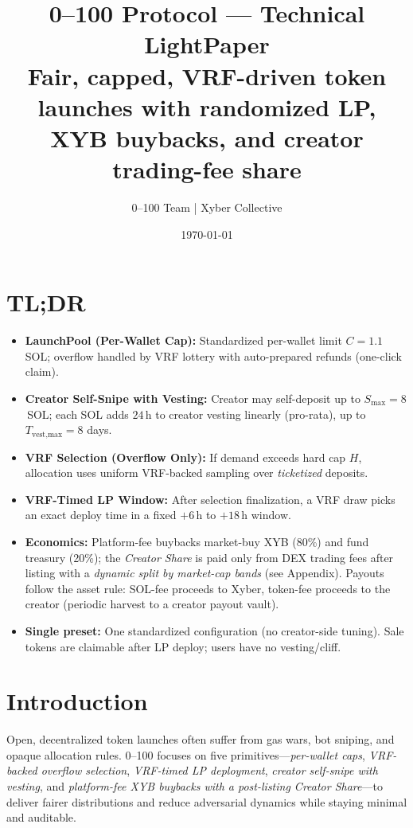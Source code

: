 \documentclass[10pt,twocolumn]{article}
\title{\Huge\bfseries 0--100 Protocol --- Technical LightPaper \\
\vspace{1ex} \large Fair, capped, VRF-driven token launches with randomized LP, \textdollar XYB buybacks, and creator trading-fee share}
\author{0--100 Team | Xyber Collective}
\date{\today}
\newcommand{\Ccap}{1.1}            %
\newcommand{\LPWinStart}{6}        %
\newcommand{\LPWinEnd}{18}         %
\newcommand{\CreatorSnipeMax}{8}   %
\newcommand{\VestingPerSolHours}{24} %
\begin{document}
\twocolumn[
  \begin{center}
    \maketitle
    \vspace{-1em}
  \end{center}
]


\section*{TL;DR}
\begin{itemize}
  \item \textbf{LaunchPool (Per-Wallet Cap):} Standardized per-wallet limit $C{=}\Ccap$\,SOL; overflow handled by VRF lottery with auto-prepared refunds (one-click claim).
  \item \textbf{Creator Self-Snipe with Vesting:} Creator may self-deposit up to $S_{\max}{=}\CreatorSnipeMax$\,SOL; each SOL adds $\VestingPerSolHours$\,h to creator vesting linearly (pro-rata), up to $T_{\text{vest,max}}{=}\CreatorSnipeMax$ days.
  \item \textbf{VRF Selection (Overflow Only):} If demand exceeds hard cap $H$, allocation uses uniform VRF-backed sampling over \emph{ticketized} deposits.
  \item \textbf{VRF-Timed LP Window:} After selection finalization, a VRF draw picks an exact deploy time in a fixed $+\LPWinStart$\,h to $+\LPWinEnd$\,h window.
  \item \textbf{Economics:} Platform-fee buybacks market-buy \textdollar XYB (80\%) and fund treasury (20\%); the \emph{Creator Share} is paid only from DEX trading fees after listing with a \emph{dynamic split by market-cap bands} (see Appendix). Payouts follow the asset rule: SOL-fee proceeds to Xyber, token-fee proceeds to the creator (periodic harvest to a creator payout vault).
  \item \textbf{Single preset:} One standardized configuration (no creator-side tuning). Sale tokens are claimable after LP deploy; users have no vesting/cliff.
\end{itemize}

\section*{Introduction}
Open, decentralized token launches often suffer from gas wars, bot sniping, and opaque allocation rules. 0--100 focuses on five primitives—\emph{per-wallet caps}, \emph{VRF-backed overflow selection}, \emph{VRF-timed LP deployment}, \emph{creator self-snipe with vesting}, and \emph{platform-fee \textdollar XYB buybacks with a post-listing Creator Share}—to deliver fairer distributions and reduce adversarial dynamics while staying minimal and auditable.
\end{document}
